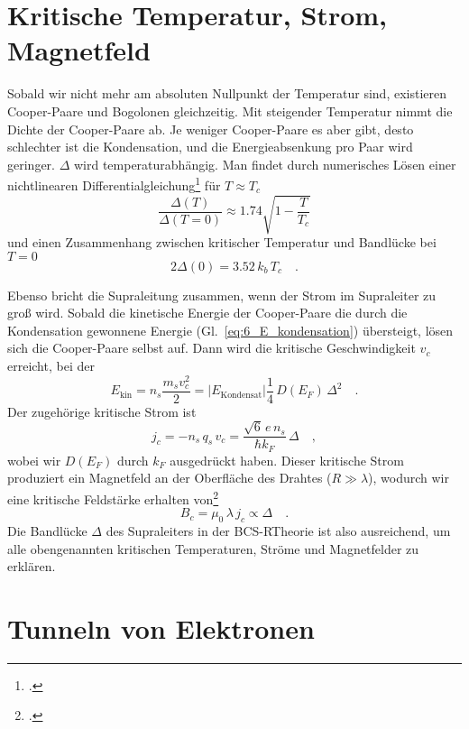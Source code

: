 \section*{Kritische Temperatur, Strom, Magnetfeld}

Sobald wir nicht mehr am absoluten Nullpunkt der Temperatur sind, existieren Cooper-Paare und Bogolonen gleichzeitig. Mit steigender Temperatur nimmt die Dichte der Cooper-Paare ab. Je weniger Cooper-Paare es aber gibt, desto schlechter ist die Kondensation, und die Energieabsenkung pro Paar wird geringer. $\Delta$ wird temperaturabhängig. Man findet durch numerisches Lösen einer nichtlinearen Differentialgleichung\footcite{Gross_FK} für $T \approx T_c$
\begin{equation}
    \frac{\Delta(T)}{\Delta(T=0)} \approx 1.74 \sqrt{1 - \frac{T}{T_c}}
\end{equation}
und einen Zusammenhang zwischen kritischer Temperatur und Bandlücke bei $T=0$
\begin{equation}
    2 \Delta(0) = 3.52  \, k_b  \, T_c \quad .
\end{equation}

Ebenso bricht die Supraleitung zusammen, wenn der Strom im Supraleiter zu groß wird. Sobald die kinetische Energie der Cooper-Paare die durch die Kondensation gewonnene Energie (Gl.~\ref{eq:6_E_kondensation}) übersteigt, lösen sich die Cooper-Paare selbst auf. Dann wird die kritische Geschwindigkeit $v_c$ erreicht, bei der 
\begin{equation}
    E_\text{kin} = n_s \frac{m_s v_c^2}{2} =  | E_\text{Kondensat} |  \frac{1}{4} \, D(E_F) \, \Delta^2 \quad .
\end{equation}
Der zugehörige kritische Strom ist
\begin{equation}
    j_c = - n_s \, q_s \,  v_c = \frac{\sqrt{6 } \,  e \, n_s}{\hbar k_F} \, \Delta \quad ,
\end{equation}
wobei wir $D(E_F)$ durch $k_F$ ausgedrückt haben. Dieser kritische Strom produziert ein Magnetfeld an der Oberfläche des Drahtes ($R \gg \lambda$), wodurch wir eine kritische Feldstärke erhalten von\footcite{Hunklinger2014}
\begin{equation}
 B_c = \mu_0 \, \lambda \, j_c  \propto \Delta \quad .
\end{equation}
Die Bandlücke $\Delta$ des Supraleiters in der BCS-RTheorie ist also ausreichend, um alle obengenannten kritischen Temperaturen, Ströme und Magnetfelder zu erklären.

\section{Tunneln von Elektronen}

